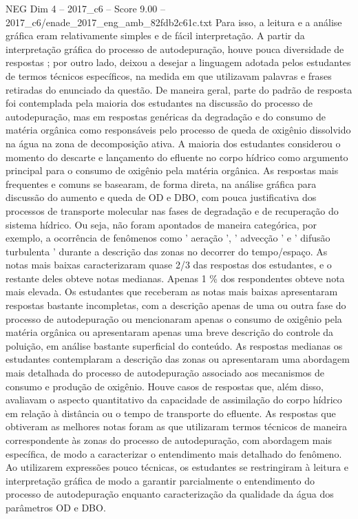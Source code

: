 \begin{textsample}{NEG Dim 4 – 2017\_c6 – Score 9.00 – 2017\_c6/enade\_2017\_eng\_amb\_82fdb2c61c.txt}
Para isso, a leitura e a análise gráfica eram relativamente simples e de fácil interpretação.
A partir da interpretação gráfica do processo de autodepuração, houve pouca diversidade de respostas ; por outro lado, deixou a desejar a linguagem adotada pelos estudantes de termos técnicos específicos, na medida em que utilizavam palavras e frases retiradas do enunciado da questão.
De maneira geral, parte do padrão de resposta foi contemplada pela maioria dos estudantes na discussão do processo de autodepuração, mas em respostas genéricas da degradação e do consumo de matéria orgânica como responsáveis pelo processo de queda de oxigênio dissolvido na água na zona de decomposição ativa.
A maioria dos estudantes considerou o momento do descarte e lançamento do efluente no corpo hídrico como argumento principal para o consumo de oxigênio pela matéria orgânica.
As respostas mais frequentes e comuns se basearam, de forma direta, na análise gráfica para discussão do aumento e queda de OD e DBO, com pouca justificativa dos processos de transporte molecular nas fases de degradação e de recuperação do sistema hídrico.
Ou seja, não foram apontados de maneira categórica, por exemplo, a ocorrência de fenômenos como ' aeração ', ' advecção ' e ' difusão turbulenta ' durante a descrição das zonas no decorrer do tempo/espaço.
As notas mais baixas caracterizaram quase 2/3 das respostas dos estudantes, e o restante deles obteve notas medianas.
Apenas 1 \% dos respondentes obteve nota mais elevada.
Os estudantes que receberam as notas mais baixas apresentaram respostas bastante incompletas, com a descrição apenas de uma ou outra fase do processo de autodepuração ou mencionaram apenas o consumo de oxigênio pela matéria orgânica ou apresentaram apenas uma breve descrição do controle da poluição, em análise bastante superficial do conteúdo.
As respostas medianas os estudantes contemplaram a descrição das zonas ou apresentaram uma abordagem mais detalhada do processo de autodepuração associado aos mecanismos de consumo e produção de oxigênio.
Houve casos de respostas que, além disso, avaliavam o aspecto quantitativo da capacidade de assimilação do corpo hídrico em relação à distância ou o tempo de transporte do efluente.
As respostas que obtiveram as melhores notas foram as que utilizaram termos técnicos de maneira correspondente às zonas do processo de autodepuração, com abordagem mais específica, de modo a caracterizar o entendimento mais detalhado do fenômeno.
Ao utilizarem expressões pouco técnicas, os estudantes se restringiram à leitura e interpretação gráfica de modo a garantir parcialmente o entendimento do processo de autodepuração enquanto caracterização da qualidade da água dos parâmetros OD e DBO.

\end{textsample}
